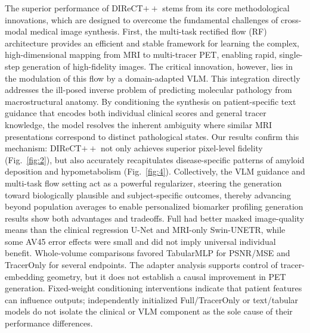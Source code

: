 \documentclass{article}
\providecommand{\DIFaddtex}[1]{{\protect\color{blue} \sf #1}} %
\providecommand{\DIFdeltex}[1]{{\protect\color{red} \scriptsize #1}} %
\providecommand{\DIFaddbegin}{} %
\providecommand{\DIFaddend}{} %
\providecommand{\DIFdelbegin}{} %
\providecommand{\DIFdelend}{} %
\providecommand{\DIFadd}[1]{\texorpdfstring{\DIFaddtex{#1}}{#1}} %
\providecommand{\DIFdel}[1]{\texorpdfstring{\DIFdeltex{#1}}{}} %
\newcommand{\DIFscaledelfig}{0.5}
\newlength{\DIFdelgraphicswidth} %
\newlength{\DIFdelgraphicsheight} %
\newcommand{\DIFaddincludegraphics}[2][]{{\color{blue}\fbox{\DIFOincludegraphics[#1]{#2}}}} %
\newcommand{\DIFdelincludegraphics}[2][]{%
\sbox{\DIFdelgraphicsbox}{\DIFOincludegraphics[#1]{#2}}%
\settoboxwidth{\DIFdelgraphicswidth}{\DIFdelgraphicsbox} %
\settoboxtotalheight{\DIFdelgraphicsheight}{\DIFdelgraphicsbox} %
\scalebox{\DIFscaledelfig}{%
\parbox[b]{\DIFdelgraphicswidth}{\usebox{\DIFdelgraphicsbox}\\[-\baselineskip] \rule{\DIFdelgraphicswidth}{0em}}\llap{\resizebox{\DIFdelgraphicswidth}{\DIFdelgraphicsheight}{%
\setlength{\unitlength}{\DIFdelgraphicswidth}%
\begin{picture}(1,1)%
\thicklines\linethickness{2pt} %
{\color[rgb]{1,0,0}\put(0,0){\framebox(1,1){}}}%
{\color[rgb]{1,0,0}\put(0,0){\line( 1,1){1}}}%
{\color[rgb]{1,0,0}\put(0,1){\line(1,-1){1}}}%
\end{picture}%
}\hspace*{3pt}}} %
} %
\DeclareRobustCommand{\DIFaddbegin}{\DIFOaddbegin \let\includegraphics\DIFaddincludegraphics} %
\DeclareRobustCommand{\DIFaddend}{\DIFOaddend \let\includegraphics\DIFOincludegraphics} %
\DeclareRobustCommand{\DIFdelbegin}{\DIFOdelbegin \let\includegraphics\DIFdelincludegraphics} %
\DeclareRobustCommand{\DIFdelend}{\DIFOaddend \let\includegraphics\DIFOincludegraphics} %
\begin{document}
The \DIFdelbegin \DIFdel{superior performance of DIReCT$++$ stems from its core methodological innovations, which are designed to overcome the fundamental challenges of cross-modal medical image synthesis. First, the multi-task rectified flow (RF) architecture provides an efficient and stable framework for learning the complex, high-dimensional mapping from MRI to multi-tracer PET, enabling rapid, single-step generation of high-fidelity images. The critical innovation, however, lies in the modulation of this flow by a domain-adapted VLM. This integration directly addresses the ill-posed inverse problem of predicting molecular pathology from macrostructural anatomy. By conditioning the synthesis on patient-specific text guidance that encodes both individual clinical scores and general tracer knowledge, the model resolves the inherent ambiguity where similar MRI presentations correspond to distinct pathological states. Our results confirm this mechanism: DIReCT$++$ not only achieves superior pixel-level fidelity (Fig.~\ref{fig:2}), but also accurately recapitulates disease-specific patterns of amyloid deposition and hypometabolism (Fig.~\ref{fig:4}). Collectively, the VLM guidance and multi-task flow setting act as a powerful regularizer, steering the generation toward biologically plausible and subject-specific outcomes, thereby advancing beyond population averages to enable personalized biomarker profiling}\DIFdelend \DIFaddbegin \DIFadd{generation results show both advantages and tradeoffs. Full had better masked image-quality means than the clinical regression U-Net and MRI-only Swin-UNETR, while some AV45 error effects were small and did not imply universal individual benefit. Whole-volume comparisons favored TabularMLP for PSNR/MSE and TracerOnly for several endpoints. The adapter analysis supports control of tracer-embedding geometry, but it does not establish a causal improvement in PET generation. Fixed-weight conditioning interventions indicate that patient features can influence outputs; independently initialized Full/TracerOnly or text/tabular models do not isolate the clinical or VLM component as the sole cause of their performance differences}\DIFaddend .
\end{document}
